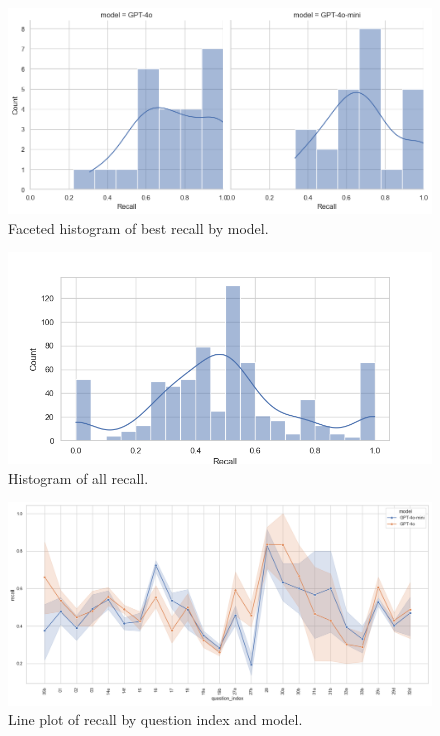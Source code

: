                 \begin{figure}[H]
                    \centering
                    \includegraphics[width=0.75\linewidth]{images_exp2/recall/facet_hist_recall_by_model_best_recall.png}
                    \caption{Faceted histogram of best recall by model.}
                    \label{fig:facet_hist_recall_by_model_best_recall}
                \end{figure}

                \begin{figure}[H]
                    \centering
                    \includegraphics[width=0.5\linewidth]{images_exp2/recall/hist_recall_all.png}
                    \caption{Histogram of all recall.}
                    \label{fig:hist_recall_all}
                \end{figure}

                \begin{figure}[H]
                    \centering
                    \includegraphics[width=0.75\linewidth]{images_exp2/recall/line_recall_by_question_index_and_model.png}
                    \caption{Line plot of recall by question index and model.}
                    \label{fig:line_recall_by_question_index_and_model}
                \end{figure}

